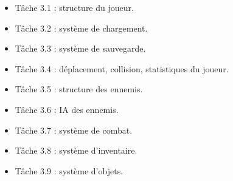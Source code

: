 \documentclass{article}
\begin{document}
\begin{figure}
\begin{itemize}
    \item Tâche 3.1 : structure du joueur.
    \item Tâche 3.2 : système de chargement.
    \item Tâche 3.3 : système de sauvegarde.
    \item Tâche 3.4 : déplacement, collision, statistiques du joueur.
    \item Tâche 3.5 : structure des ennemis.
    \item Tâche 3.6 : IA des ennemis.
    \item Tâche 3.7 : système de combat.
    \item Tâche 3.8 : système d’inventaire.
    \item Tâche 3.9 : système d’objets.
  \end{itemize}
\end{figure}
\end{document}
